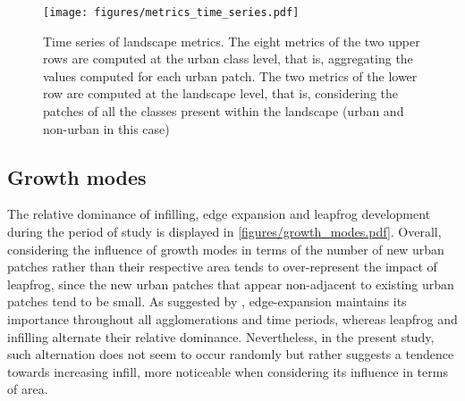 \documentclass[10pt,letterpaper]{article}
\begin{document}
\begin{figure}[ht]
  \begin{adjustwidth}{-.4\textwidth}{0cm}
    \centering  
    \texttt{[image: figures/metrics\_time\_series.pdf]}
    \vspace{.5em}
    \caption[Time series of landscape metrics]{\label{figures/metrics_time_series.pdf}Time series of landscape metrics. The eight metrics of the two upper rows are computed at the urban class level, that is, aggregating the values computed for each urban patch. The two metrics of the lower row are computed at the landscape level, that is, considering the patches of all the classes present within the landscape (urban and non-urban in this case)}
  \end{adjustwidth}
\end{figure}


\subsection*{Growth modes}

The relative dominance of infilling, edge expansion and leapfrog development during the period of study is displayed in \autoref{figures/growth_modes.pdf}.
Overall, considering the influence of growth modes in terms of the number of new urban patches rather than their respective area tends to over-represent the impact of leapfrog, since the new urban patches that appear non-adjacent to existing urban patches tend to be small.
As suggested by \cite{li2013quantifying}, edge-expansion maintains its importance throughout all agglomerations and time periods, whereas leapfrog and infilling alternate their relative dominance.
Nevertheless, in the present study, such alternation does not seem to occur randomly but rather suggests a tendence towards increasing infill, more noticeable when considering its influence in terms of area.
\end{document}
